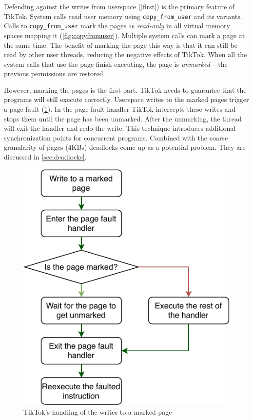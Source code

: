 Defending against the writes from userspace (\cref{first}) is the primary
feature of TikTok. System calls read user memory using \texttt{copy\_from\_user}
and its variants. Calls to \texttt{copy\_from\_user} mark the pages as
\emph{read-only} in all virtual memory spaces mapping it
(\cref{fig:copyfromuser}). Multiple system calls can mark a page at the same
time. The benefit of marking the page this way is that it can still be read by
other user threads, reducing the negative effects of TikTok. When all the system
calls that use the page finish executing, the page is \emph{unmarked} -- the
previous permissions are restored.

However, marking the pages is the first part. TikTok needs to guarantee that the
programs will still execute correctly. Userspace writes to the marked pages
trigger a page-fault (\cref{fig:pagefault}). In the page-fault handler TikTok
intercepts these writes and stops them until the page has been unmarked. After
the unmarking, the thread will exit the handler and redo the write. This
technique introduces additional synchronization points for concurrent programs.
Combined with the coarse granularity of pages (4KBs) deadlocks come up as a
potential problem. They are discussed in \cref{sec:deadlocks}.

\begin{figure}[]
  \centering
  \includegraphics[width = .75 \linewidth]{img/pagefault.pdf}
  \caption{TikTok's handling of the writes to a marked page}
  \label{fig:pagefault}
\end{figure}

